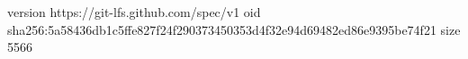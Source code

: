 version https://git-lfs.github.com/spec/v1
oid sha256:5a58436db1c5ffe827f24f290373450353d4f32e94d69482ed86e9395be74f21
size 5566
